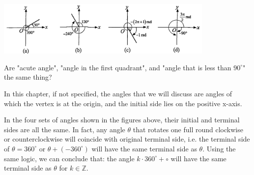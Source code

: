 \documentclass{report}
\begin{document}
\begin{center}
    \includegraphics[width=0.8\textwidth]{assets/9-1.jpg}
\end{center}
\vspace{-1em}

\begin{think}
    Are "acute angle", "angle in the first quadrant", and "angle that is less than $90^\circ$" the same thing?
\end{think}

In this chapter, if not specified, the angles that we will discuss are angles of which the vertex is at the origin, and the initial side lies on the positive x-axis.

In the four sets of angles shown in the figures above, their initial and terminal sides are all the same. In fact, any angle $\theta$ that rotates one full round clockwise or counterclockwise will coincide with original terminal side, i.e. the terminal side of $\theta = 360^\circ$ or $\theta + (-360^\circ)$ will have the same terminal side as $\theta$. Using the same logic, we can conclude that: the angle $k \cdot 360^\circ + \circ$ will have the same terminal side as $\theta$ for $k \in \mathbb{Z}$.
\end{document}
